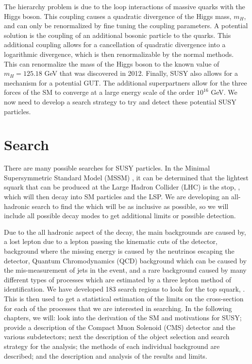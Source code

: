The hierarchy problem is due to the loop interactions of massive quarks with the Higgs boson. This coupling causes a quadratic divergence of the Higgs mass, $m_H$, and can only be renormalized by fine tuning the coupling parameters. A potential solution is the coupling of an additional bosonic particle to the quarks. This additional coupling allows for a cancellation of quadratic divergence into a logarithmic divergence, which is then renormalizable by the normal methods. This can renormalize the mass of the Higgs boson to the known value of $m_H=125.18$ GeV \cite{chatrchyan_observation_2012, aad_observation_2012, chatrchyan_observation_2013, atlas_collaboration_combined_2015} that was discovered in 2012. Finally, SUSY also allows for a mechanism for a potential GUT. The additional superpartners allow for the three forces of the SM to converge at a large energy scale of the order $10^{16}$ GeV. We now need to develop a search strategy to try and detect these potential SUSY particles.

\section{Search}
\label{sec:search}

There are many possible searches for SUSY particles. In the Minimal Supersymmetric Standard Model (MSSM) \cite{martin_supersymmetry_1997}, it can be determined that the lightest squark that can be produced at the Large Hadron Collider (LHC) is the stop, \st{}, which will then decay into SM particles and the LSP.  We are developing an all-hadronic search to find the \st{} which will be as inclusive as possible, so we will include all possible decay modes to get additional limits or possible detection. 

Due to the all hadronic aspect of the decay, the main backgrounds are caused by, a lost lepton due to a lepton passing the kinematic cuts of the detector, \Znunu{} background where the missing energy is caused by the neutrinos escaping the detector, Quantum Chromodynamics (QCD) background which can be caused by the mis-measurement of jets in the event, and a rare background caused by many different types of processes which are estimated by a three lepton method of identification. We have developed 183 search regions to look for the top squark, \st{}. This is then used to get a statistical estimation of the limits on the cross-section for each of the processes that we are interested in searching. In the following chapters, we will: look into the derivation of the SM and motivations for SUSY; provide a description of the Compact Muon Solenoid (CMS) detector and the various subdetectors; next the description of the object selection and search strategy for the analysis; the methods of each individual background are described; and the description and analysis of the results and limits. 

